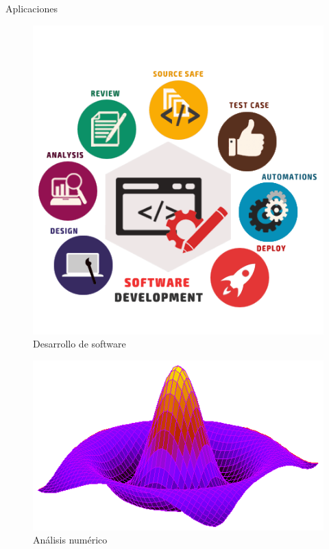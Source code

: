 \documentclass{beamer}
\begin{document}
\begin{frame}[t]{Aplicaciones}\vspace{24pt}
\begin{multicols}{3}
\begin{figure}
	\centering
	\includegraphics[scale=0.2]{softdev}
	\caption{Desarrollo de software}
\end{figure}
\begin{figure}
	\centering
	\includegraphics[scale=0.23]{math}
	\caption{Análisis numérico}	
\end{figure}
\begin{figure}
	\centering

\end{figure}
\end{multicols}
\end{frame}
\end{document}
